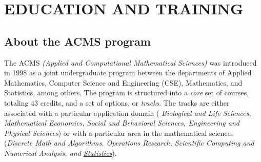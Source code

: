 \section{EDUCATION AND TRAINING}
\label{sec:education}
\subsection{\bf About the ACMS program}

The ACMS {\em (Applied and Computational Mathematical Sciences)} was
introduced in 1998 as a joint undergraduate program between the
departments of Applied Mathematics, Computer Science and Engineering
(CSE), Mathematics, and Statistics, among others.
The program is structured into a {\em core} set of courses,
totaling 43 credits, and a set of options, or {\em tracks}. The tracks
are either associated with a particular application domain ({\em
  Biological and Life Sciences, Mathematical Economics, Social and
  Behavioral Sciences, Engineering and Physical Sciences}) or with a
particular area in the mathematical sciences ({\em Discrete Math and
  Algorithms, Operations Research, Scientific Computing and Numerical
  Analysis, and \underline{Statistics}}).

